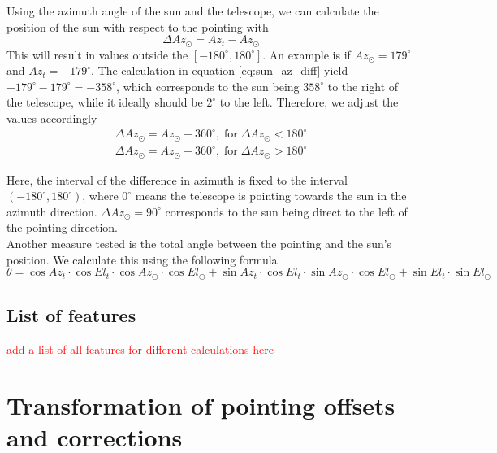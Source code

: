 Using the azimuth angle of the sun and the telescope, we can calculate the position of the sun with respect to the pointing with
\begin{equation}\label{eq:sun_az_diff}
    \Delta \textit{Az}_\odot = \textit{Az}_{\textit{t}} - \textit{Az}_\odot
\end{equation}
This will result in values outside the $[-180^\circ,180^\circ]$. An example is if $Az_\odot=179^\circ$ and $Az_t = -179^\circ$.
The calculation in equation \eqref{eq:sun_az_diff} yield $-179^\circ-179^\circ=-358^\circ$,
which corresponds to the sun being $358^\circ$ to the right of the telescope, while it ideally should be $2^\circ$ to the left.
Therefore, we adjust the values accordingly
\begin{align}
    \Delta Az_\odot = Az_\odot +360^\circ, \; \text{for} \; \Delta Az_\odot < 180^\circ\\
    \Delta Az_\odot = Az_\odot -360^\circ, \; \text{for} \; \Delta Az_\odot > 180^\circ
\end{align}

Here, the interval of the difference in azimuth is fixed to the interval $(-180^\circ,180^\circ)$,
where $0^\circ$ means the telescope is pointing towards the sun in the azimuth direction.
$\Delta \textit{Az}_\odot = 90^\circ$ corresponds to the sun being direct to the left of the pointing direction. \\

Another measure tested is the total angle between the pointing and the sun's position. We calculate this using the following formula
\begin{equation}
    \theta = \cos \textit{Az}_t \cdot \cos \textit{El}_t\cdot \cos \textit{Az}_\odot \cdot \cos \textit{El}_\odot + \sin \textit{Az}_t \cdot \cos \textit{El}_t\cdot \sin \textit{Az}_\odot \cdot \cos \textit{El}_\odot + \sin \textit{El}_t \cdot \sin \textit{El}_\odot
\end{equation}

\subsection{List of features}
\textcolor{red}{add a list of all features for different calculations here}

\section{Transformation of pointing offsets and corrections}


